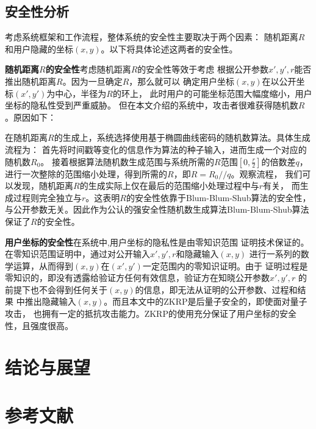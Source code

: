 \documentclass[zihao=-4]{ctexart}
\begin{document}
\subsection{安全性分析}
考虑系统框架和工作流程，整体系统的安全性主要取决于两个因素：
随机距离$R$和用户隐藏的坐标$(x,y)$。以下将具体论述这两者的安全性。\par
\textbf{随机距离$R$的安全性}\quad 考虑随机距离$R$的安全性等效于考虑
根据公开参数$x',y',r$能否推出随机距离$R$。因为一旦确定$R$，那么就可以
确定用户坐标$(x,y)$在以公开坐标$(x',y')$为中心，半径为$R$的环上，
此时用户的可能坐标范围大幅度缩小，用户坐标的隐私性受到严重威胁。
但在本文介绍的系统中，攻击者很难获得随机数$R$。原因如下：\par
在随机距离$R$的生成上，系统选择使用基于椭圆曲线密码的随机数算法。具体生成流程为：
首先将时间戳等变化的信息作为算法的种子输入，进而生成一个对应的随机数$R_0$。
接着根据算法随机数生成范围与系统所需的$R$范围$[0,\frac{r}{2}]$的倍数差$q$，
进行一次整除的范围缩小处理，得到所需的$R$，即$R=R_0//q$。观察流程，
我们可以发现，随机距离$R$的生成实际上仅在最后的范围缩小处理过程中与$r$有关，
而生成过程则完全独立与$r$。这表明$R$的安全性依靠于Blum-Blum-Shub算法的安全性，
与公开参数无关。因此作为公认的强安全性随机数生成算法Blum-Blum-Shub算法
保证了$R$的安全性。\par
\textbf{用户坐标的安全性}\quad 在系统中,用户坐标的隐私性是由零知识范围
证明技术保证的。在零知识范围证明中，通过对公开输入$x',y',r$和隐藏输入$(x,y)$
进行一系列的数学运算，从而得到$(x,y)$在$(x',y')$一定范围内的零知识证明。由于
证明过程是零知识的，即没有透露给验证方任何有效信息，验证方在知晓公开参数$x',y',r$
的前提下也不会得到任何关于$(x,y)$的信息，即无法从证明的公开参数、过程和结果
中推出隐藏输入$(x,y)$。而且本文中的ZKRP是后量子安全的，即使面对量子攻击，
也拥有一定的抵抗攻击能力。ZKRP的使用充分保证了用户坐标的安全性，且强度很高。
\section{结论与展望}

\section{参考文献}
\end{document}
